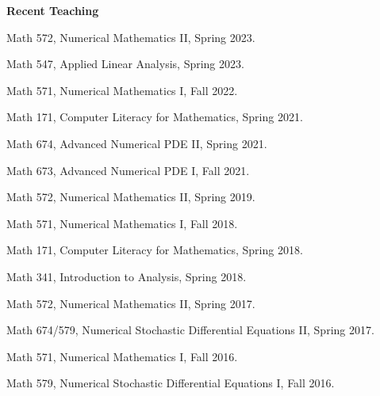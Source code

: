 \documentclass[11pt]{letter}
\begin{document}
	{\LARGE\bf  Recent Teaching}
    \begin{description}
    \item
Math 572, Numerical Mathematics II, Spring 2023.
	\item
Math 547, Applied Linear Analysis, Spring 2023.
    
    \item
Math 571, Numerical Mathematics I, Fall 2022.
    \item
Math 171, Computer Literacy for Mathematics, Spring 2021.
    \item
Math 674, Advanced Numerical PDE II, Spring 2021.
    \item
Math 673, Advanced Numerical PDE I, Fall 2021.
    \item
Math 572, Numerical Mathematics II, Spring 2019.
    \item
Math 571, Numerical Mathematics I, Fall 2018.
    \item
Math 171, Computer Literacy for Mathematics, Spring 2018.
    \item
Math 341, Introduction to Analysis, Spring 2018.
    \item
Math 572, Numerical Mathematics II, Spring 2017.
    \item
Math 674/579, Numerical Stochastic Differential Equations II, Spring 2017.
    \item
Math 571, Numerical Mathematics I, Fall 2016.
    \item
Math 579, Numerical Stochastic Differential Equations I, Fall 2016.

	\end{description}
\end{document}
